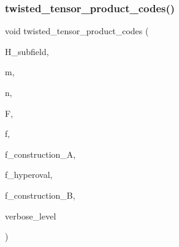 \mbox{\label{tensor_8_c_adc92206fd9c137be57386b30cc834f7e}} 
\subsubsection{\texorpdfstring{twisted\+\_\+tensor\+\_\+product\+\_\+codes()}{twisted\_tensor\_product\_codes()}}
{\footnotesize\ttfamily void twisted\+\_\+tensor\+\_\+product\+\_\+codes (\begin{DoxyParamCaption}\item[{\mbox{\hyperlink{galois_8h_a09fddde158a3a20bd2dcadb609de11dc}{I\+NT}} $\ast$\&}]{H\+\_\+subfield,  }\item[{\mbox{\hyperlink{galois_8h_a09fddde158a3a20bd2dcadb609de11dc}{I\+NT}} \&}]{m,  }\item[{\mbox{\hyperlink{galois_8h_a09fddde158a3a20bd2dcadb609de11dc}{I\+NT}} \&}]{n,  }\item[{\mbox{\hyperlink{classfinite__field}{finite\+\_\+field}} $\ast$}]{F,  }\item[{\mbox{\hyperlink{classfinite__field}{finite\+\_\+field}} $\ast$}]{f,  }\item[{\mbox{\hyperlink{galois_8h_a09fddde158a3a20bd2dcadb609de11dc}{I\+NT}}}]{f\+\_\+construction\+\_\+A,  }\item[{\mbox{\hyperlink{galois_8h_a09fddde158a3a20bd2dcadb609de11dc}{I\+NT}}}]{f\+\_\+hyperoval,  }\item[{\mbox{\hyperlink{galois_8h_a09fddde158a3a20bd2dcadb609de11dc}{I\+NT}}}]{f\+\_\+construction\+\_\+B,  }\item[{\mbox{\hyperlink{galois_8h_a09fddde158a3a20bd2dcadb609de11dc}{I\+NT}}}]{verbose\+\_\+level }\end{DoxyParamCaption})}

